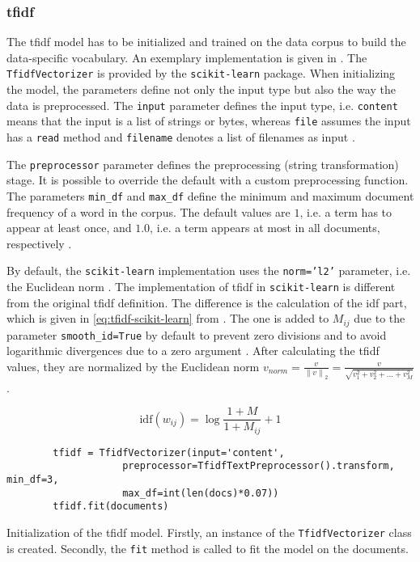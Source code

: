 \subsubsection*{\ac{tfidf}}\label{subsubsec:impl-tfidf}

The \ac{tfidf} model has to be initialized and trained on the data corpus to build the data-specific vocabulary.
An exemplary implementation is given in .
The \texttt{TfidfVectorizer} is provided by the \texttt{scikit-learn} package.
When initializing the model, the parameters define not only the input type but also the way the data is preprocessed.
The \texttt{input} parameter defines the input type, i.e. \texttt{content} means that the input is a list of strings or bytes, 
whereas \texttt{file} assumes the input has a \texttt{read} method and \texttt{filename} denotes a list of filenames as input \cite{tfidf-vec-scikit-learn}.

The \texttt{preprocessor} parameter defines the preprocessing (string transformation) stage.
It is possible to override the default with a custom preprocessing function.
The parameters \texttt{min\_df} and \texttt{max\_df} define the minimum and maximum document frequency of a word in the corpus.
The default values are $1$, i.e. a term has to appear at least once, and $1.0$, i.e. a term appears at most in all documents, respectively \cite{tfidf-vec-scikit-learn}.

By default, the \texttt{scikit-learn} implementation uses the \texttt{norm='l2'} parameter, i.e. the Euclidean norm \cite{tfidf-scikit-learn}.
The implementation of \ac{tfidf} in \texttt{scikit-learn} is different from the original \ac{tfidf} definition.
The difference is the calculation of the \ac{idf} part, which is given in \autoref{eq:tfidf-scikit-learn} from \cite{tfidf-scikit-learn}.
The one is added to $M_{ij}$ due to the parameter \texttt{smooth\_id=True} by default to prevent zero divisions \cite{tfidf-scikit-learn}
and to avoid logarithmic divergences due to a zero argument \cite{glove2014}.
After calculating the \ac{tfidf} values, they are normalized by the Euclidean norm 
$v_{norm} = \frac{v}{\left\| v \right\|_{2}} = \frac{v}{\sqrt{v_1^{2} + v_2^{2} + ... + v_M^{2}}}$.

\begin{equation}
    \text{idf}(w_{ij}) = \log \frac{1 + M}{1 + M_{ij}} + 1    
    \label{eq:tfidf-scikit-learn}
\end{equation}

\begin{listing}[htp]
    \begin{verbatim}
        tfidf = TfidfVectorizer(input='content', 
                    preprocessor=TfidfTextPreprocessor().transform, min_df=3, 
                    max_df=int(len(docs)*0.07))
        tfidf.fit(documents)
    \end{verbatim}
    \caption[Initialization of the \ac{tfidf} model]{Initialization of the \ac{tfidf} model.
    Firstly, an instance of the \texttt{TfidfVectorizer} class is created.
    Secondly, the \texttt{fit} method is called to fit the model on the documents.
    }
    \label{lst:impl-tfidf}
\end{listing}

